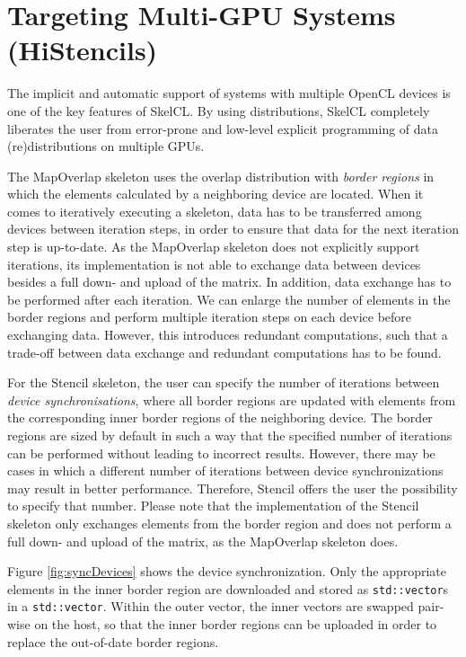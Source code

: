 \section{Targeting Multi-GPU Systems (HiStencils)}
\label{sec:multi_gpu}
The implicit and automatic support of systems with multiple OpenCL devices is one of the key features of SkelCL.
By using distributions, SkelCL completely liberates the user from error-prone and low-level explicit programming of data (re)distributions on multiple GPUs. 

The MapOverlap skeleton uses the overlap distribution with \textit{border regions} in which the elements calculated by a neighboring device are located.
When it comes to iteratively executing a skeleton, data has to be transferred among devices between iteration steps, in order to ensure that data for the next iteration step is up-to-date.
As the MapOverlap skeleton does not explicitly support iterations, its implementation is not able to exchange data between devices besides a full down- and upload of the matrix.
In addition, data exchange has to be performed after each iteration.
We can enlarge the number of elements in the border regions and perform multiple iteration steps on each device before exchanging data.
However, this introduces redundant computations, such that a trade-off between data exchange and redundant computations has to be found.
 
For the Stencil skeleton, the user can specify the number of iterations between \textit{device synchronisations}, where all border regions are updated with elements from the corresponding inner border regions of the neighboring device.
The border regions are sized by default in such a way that the specified number of iterations can be performed without leading to incorrect results.
However, there may be cases in which a different number of iterations between device synchronizations may result in better performance.
Therefore, Stencil offers the user the possibility to specify that number.
Please note that the implementation of the Stencil skeleton only exchanges elements from the border region and does not perform a full down- and upload of the matrix, as the MapOverlap skeleton does.

Figure \ref{fig:syncDevices} shows the device synchronization.
Only the appropriate elements in the inner border region are downloaded and stored as \texttt{std::vector}s in a \texttt{std::vector}.
Within the outer vector, the inner vectors are swapped pair-wise on the host, so that the inner border regions can be uploaded in order to replace the out-of-date border regions.

